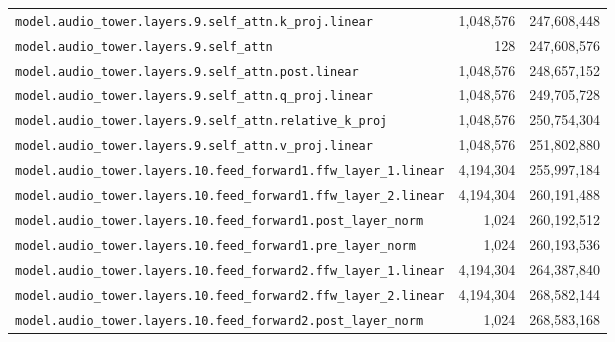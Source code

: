 \documentclass[10pt,a4paper]{article}
\theoremstyle{definition}
\begin{document}
\begin{appendices}
\begin{longtable}{p{9.5cm}rr}
\texttt{model.\allowbreak{}audio\_tower.\allowbreak{}layers.\allowbreak{}9.\allowbreak{}self\_attn.\allowbreak{}k\_proj.\allowbreak{}linear} & 1,048,576 & 247,608,448 \\
\texttt{model.\allowbreak{}audio\_tower.\allowbreak{}layers.\allowbreak{}9.\allowbreak{}self\_attn} & 128 & 247,608,576 \\
\texttt{model.\allowbreak{}audio\_tower.\allowbreak{}layers.\allowbreak{}9.\allowbreak{}self\_attn.\allowbreak{}post.\allowbreak{}linear} & 1,048,576 & 248,657,152 \\
\texttt{model.\allowbreak{}audio\_tower.\allowbreak{}layers.\allowbreak{}9.\allowbreak{}self\_attn.\allowbreak{}q\_proj.\allowbreak{}linear} & 1,048,576 & 249,705,728 \\
\texttt{model.\allowbreak{}audio\_tower.\allowbreak{}layers.\allowbreak{}9.\allowbreak{}self\_attn.\allowbreak{}relative\_k\_proj} & 1,048,576 & 250,754,304 \\
\texttt{model.\allowbreak{}audio\_tower.\allowbreak{}layers.\allowbreak{}9.\allowbreak{}self\_attn.\allowbreak{}v\_proj.\allowbreak{}linear} & 1,048,576 & 251,802,880 \\
\texttt{model.\allowbreak{}audio\_tower.\allowbreak{}layers.\allowbreak{}10.\allowbreak{}feed\_forward1.\allowbreak{}ffw\_layer\_1.\allowbreak{}linear} & 4,194,304 & 255,997,184 \\
\texttt{model.\allowbreak{}audio\_tower.\allowbreak{}layers.\allowbreak{}10.\allowbreak{}feed\_forward1.\allowbreak{}ffw\_layer\_2.\allowbreak{}linear} & 4,194,304 & 260,191,488 \\
\texttt{model.\allowbreak{}audio\_tower.\allowbreak{}layers.\allowbreak{}10.\allowbreak{}feed\_forward1.\allowbreak{}post\_layer\_norm} & 1,024 & 260,192,512 \\
\texttt{model.\allowbreak{}audio\_tower.\allowbreak{}layers.\allowbreak{}10.\allowbreak{}feed\_forward1.\allowbreak{}pre\_layer\_norm} & 1,024 & 260,193,536 \\
\texttt{model.\allowbreak{}audio\_tower.\allowbreak{}layers.\allowbreak{}10.\allowbreak{}feed\_forward2.\allowbreak{}ffw\_layer\_1.\allowbreak{}linear} & 4,194,304 & 264,387,840 \\
\texttt{model.\allowbreak{}audio\_tower.\allowbreak{}layers.\allowbreak{}10.\allowbreak{}feed\_forward2.\allowbreak{}ffw\_layer\_2.\allowbreak{}linear} & 4,194,304 & 268,582,144 \\
\texttt{model.\allowbreak{}audio\_tower.\allowbreak{}layers.\allowbreak{}10.\allowbreak{}feed\_forward2.\allowbreak{}post\_layer\_norm} & 1,024 & 268,583,168 \\

\end{longtable}
\end{appendices}
\end{document}
